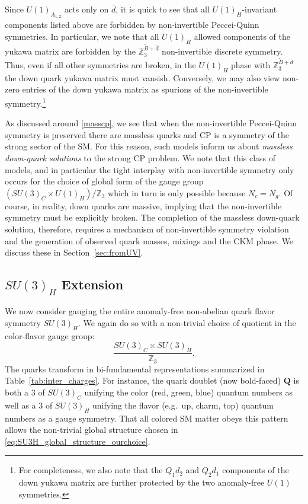 \documentclass[11pt,a4paper]{article}
\def\beq{\begin{equation}}
\def\eeq{\end{equation}}
\begin{document}
Since $U(1)_{A_{1,2}}$ acts only on $\bar{d}$, it is quick to see that all $U(1)_H$-invariant components listed above are forbidden by non-invertible Peccei-Quinn symmetries.
In particular, we note that all $U(1)_{H}$ allowed components of the yukawa matrix are forbidden by the $\mathbb{Z}_{3}^{\tilde{B}+\bar{d}}$ non-invertible discrete symmetry. 
Thus, even if all other symmetries are broken, in the $U(1)_{H}$ phase with $\mathbb{Z}_{3}^{\tilde{B}+\bar{d}}$ the down quark yukawa matrix must vansish.  Conversely, we may also view non-zero entries of the down yukawa matrix as spurions of the non-invertible symmetry.\footnote{For completeness, we also note that the $Q_1 d_2$ and $Q_2 d_1$ components of the down yukawa matrix are further protected by the two anomaly-free $U(1)$ symmetries.} 

As discussed around \eqref{masscp}, we see that when the non-invertible Peccei-Quinn symmetry is preserved there are massless quarks and CP is a symmetry of the strong sector of the SM.  For this reason, such models inform us about \emph{massless down-quark solutions} to the strong CP problem.  We note that this class of models, and in particular the tight interplay with non-invertible symmetry only occurs for the choice of global form of the gauge group $(SU(3)_{C}\times U(1)_{H})/\mathbb{Z}_{3}$ which in turn is only possible because $N_{c}=N_{g}.$  Of course, in reality, down quarks are massive, implying that the non-invertible symmetry must be explicitly broken. The completion of the massless down-quark solution, therefore, requires a mechanism of non-invertible symmetry violation and the generation of observed quark masses, mixings and the CKM phase. We discuss these in Section~\ref{sec:fromUV}.




\subsection{\texorpdfstring{$SU(3)_H$}{SU(3)H} Extension}
\label{subsec:SU3H_ext}

We now consider gauging the entire anomaly-free non-abelian quark flavor symmetry $SU(3)_H$.  We again do so with a non-trivial choice of quotient in the color-flavor gauge group:
\beq 
\frac{SU(3)_C \times SU(3)_H}{\mathbb{Z}_{3}}.
\label{eq:SU3H_global_structure_ourchoice}
\eeq 
The quarks transform in bi-fundamental representations  summarized in Table~\ref{tab:inter_charges}. For instance, the quark doublet (now bold-faced) $\mathbf{Q}$ is both a $3$ of $SU(3)_C$ unifying the color (red, green, blue) quantum numbers as well as a $3$ of $SU(3)_H$ unifying the flavor (e.g.~up, charm, top) quantum numbers as a gauge symmetry. That all colored SM matter obeys this pattern allows the non-trivial global structure chosen in \eqref{eq:SU3H_global_structure_ourchoice}.
\end{document}
